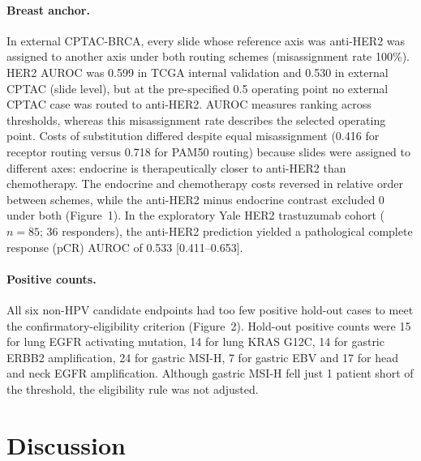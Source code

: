 \documentclass[a4paper,10pt,twocolumn]{extarticle}
\begin{document}
\paragraph{Breast anchor.} In external CPTAC-BRCA, every slide whose reference axis was anti-HER2 was assigned to another axis under both routing schemes (misassignment rate 100\%). HER2 AUROC was 0.599 in TCGA internal validation and 0.530 in external CPTAC (slide level), but at the pre-specified 0.5 operating point no external CPTAC case was routed to anti-HER2. AUROC measures ranking across thresholds, whereas this misassignment rate describes the selected operating point. Costs of substitution differed despite equal misassignment (0.416 for receptor routing versus 0.718 for PAM50 routing) because slides were assigned to different axes: endocrine is therapeutically closer to anti-HER2 than chemotherapy. The endocrine and chemotherapy costs reversed in relative order between schemes, while the anti-HER2 minus endocrine contrast excluded 0 under both (Figure~1). In the exploratory Yale HER2 trastuzumab cohort ($n=85$; 36 responders), the anti-HER2 prediction yielded a pathological complete response (pCR) AUROC of 0.533 [0.411--0.653].

\paragraph{Positive counts.} All six non-HPV candidate endpoints had too few positive hold-out cases to meet the confirmatory-eligibility criterion (Figure~2). Hold-out positive counts were 15 for lung EGFR activating mutation, 14 for lung KRAS G12C, 14 for gastric ERBB2 amplification, 24 for gastric MSI-H, 7 for gastric EBV and 17 for head and neck EGFR amplification. Although gastric MSI-H fell just 1 patient short of the threshold, the eligibility rule was not adjusted.

\section{Discussion}
\end{document}
